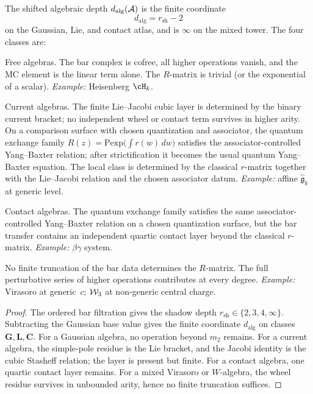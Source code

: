 \begin{proposition}
\label{prop:shadow-depth}
The shifted algebraic depth $d_{\mathrm{alg}}(\mathcal{A})$ is the
finite coordinate
\[
d_{\mathrm{alg}}=r_{\mathrm{sh}}-2
\]
on the Gaussian, Lie, and contact atlas, and is $\infty$ on the
mixed tower. The four classes are:
\begin{description}[leftmargin=2em]
\item[\textbf{G} (Gaussian, $d_{\mathrm{alg}}=0$):]
 Free algebras. The bar complex is cofree, all higher
 operations vanish, and the MC element is the linear term alone.
 The $R$-matrix is trivial (or the exponential of a scalar).
 \emph{Example:} Heisenberg $\cH_k$.
\item[\textbf{L} (Lie, $d_{\mathrm{alg}}=1$):]
 Current algebras. The finite Lie--Jacobi cubic layer is
 determined by the binary current bracket; no independent wheel
 or contact term survives in higher arity. On a comparison surface
 with chosen quantization and associator, the quantum exchange family
 $R(z) = \mathrm{Pexp}\!\bigl(\int r(w)\,dw\bigr)$ satisfies the
 associator-controlled Yang--Baxter relation; after strictification it
 becomes the usual quantum Yang--Baxter equation. The local class is
 determined by the classical $r$-matrix together with the Lie--Jacobi
 relation and the chosen associator datum.
 \emph{Example:} affine $\hat{\mathfrak{g}}_k$ at generic level.
\item[\textbf{C} (Contact, $d_{\mathrm{alg}}=2$):]
 Contact algebras. The quantum exchange family satisfies the same
 associator-controlled Yang--Baxter relation on a chosen quantization
 surface, but the bar transfer contains an independent quartic contact
 layer beyond the classical $r$-matrix.
 \emph{Example:} $\beta\gamma$ system.
\item[\textbf{M} (Mixed, $d_{\mathrm{alg}}=\infty$):]
 No finite truncation of the bar data determines the
 $R$-matrix. The full perturbative series of
 higher operations contributes at every degree.
 \emph{Example:} Virasoro at generic~$c$; $\mathcal{W}_3$ at non-generic central charge.
\end{description}
\end{proposition}

\begin{proof}
The ordered bar filtration gives the shadow depth
$r_{\mathrm{sh}}\in\{2,3,4,\infty\}$. Subtracting the Gaussian
base value gives the finite coordinate $d_{\mathrm{alg}}$ on
classes $\mathbf G,\mathbf L,\mathbf C$. For a Gaussian algebra,
no operation beyond $m_2$ remains. For a current algebra, the
simple-pole residue is the Lie bracket, and the Jacobi identity
is the cubic Stasheff relation; the layer is present but finite.
For a contact algebra, one quartic contact layer remains. For a
mixed Virasoro or $W$-algebra, the wheel residue survives in
unbounded arity, hence no finite truncation suffices.
\end{proof}

